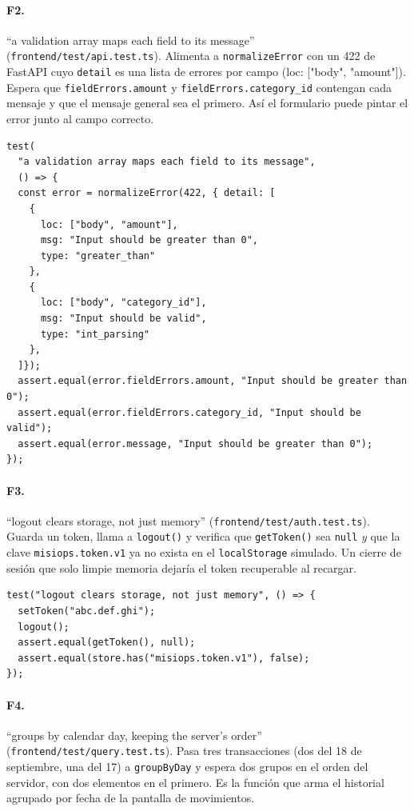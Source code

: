 \paragraph{F2.} ``a validation array maps each field to its message'' (\texttt{frontend/\allowbreak test/\allowbreak api.test.ts}).
Alimenta a \texttt{normalizeError} con un 422 de FastAPI cuyo \texttt{detail} es una lista de errores por campo ({\ttfamily loc: ["body", "amount"]}). Espera que \texttt{fieldErrors.amount} y \texttt{fieldErrors.category\_id} contengan cada mensaje y que el mensaje general sea el primero. Así el formulario puede pintar el error junto al campo correcto.

\begin{lstlisting}[breaklines=true]
test(
  "a validation array maps each field to its message", 
  () => {
  const error = normalizeError(422, { detail: [
    { 
      loc: ["body", "amount"], 
      msg: "Input should be greater than 0", 
      type: "greater_than" 
    },
    { 
      loc: ["body", "category_id"], 
      msg: "Input should be valid", 
      type: "int_parsing" 
    },
  ]});
  assert.equal(error.fieldErrors.amount, "Input should be greater than 0");
  assert.equal(error.fieldErrors.category_id, "Input should be valid");
  assert.equal(error.message, "Input should be greater than 0");
});
\end{lstlisting}

\paragraph{F3.} ``logout clears storage, not just memory'' (\texttt{frontend/\allowbreak test/\allowbreak auth.test.ts}).
Guarda un token, llama a \texttt{logout()} y verifica que \texttt{getToken()} sea \texttt{null} \emph{y} que la clave \texttt{misiops.token.v1} ya no exista en el \texttt{localStorage} simulado. Un cierre de sesión que solo limpie memoria dejaría el token recuperable al recargar.

\begin{lstlisting}[breaklines=true]
test("logout clears storage, not just memory", () => {
  setToken("abc.def.ghi");
  logout();
  assert.equal(getToken(), null);
  assert.equal(store.has("misiops.token.v1"), false);
});
\end{lstlisting}

\paragraph{F4.} ``groups by calendar day, keeping the server's order'' (\texttt{frontend/\allowbreak test/\allowbreak query.test.ts}).
Pasa tres transacciones (dos del 18 de septiembre, una del 17) a \texttt{groupByDay} y espera dos grupos en el orden del servidor, con dos elementos en el primero. Es la función que arma el historial agrupado por fecha de la pantalla de movimientos.

